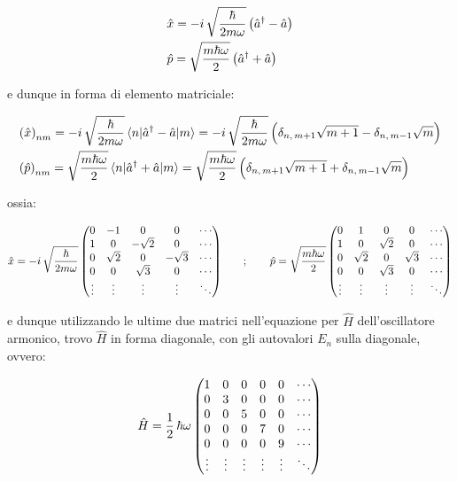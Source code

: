 \begin{nb}
\begin{align*}
	&\hat{x} = - i \, \sqrt{\frac{\hbar}{2m\omega}} \, \qty(\hat{a}^{\dagger} - \hat{a}) \\
	&\hat{p} = \sqrt{\frac{m\hbar\omega}{2}} \,\qty(\hat{a}^{\dagger} + \hat{a})
\end{align*}
\end{nb}

	e dunque in forma di elemento matriciale:
	
\begin{align*}
	&\qty(\hat{x})_{nm} = - i \, \sqrt{\frac{\hbar}{2m\omega}} \mel{n}{\hat{a}^{\dagger} - \hat{a}}{m} = - i \, \sqrt{\frac{\hbar}{2m\omega}} \, \qty\Big(\delta_{n, \, m+1} \sqrt{m+1} - \delta_{n, \, m-1}\sqrt{m}) \\
	&\qty(\hat{p})_{nm} = \sqrt{\frac{m\hbar\omega}{2}} \mel{n}{\hat{a}^{\dagger} + \hat{a}}{m} = \sqrt{\frac{m\hbar\omega}{2}} \, \qty\Big( \delta_{n, \, m+1} \sqrt{m+1} + \delta_{n, \, m-1}\sqrt{m} )
\end{align*}

	ossia:
	
\begin{align*}
	\hat{x} = - i \, \sqrt{\frac{\hbar}{2m\omega}} \,\mqty(0&-1&0&0& \cdots \\ 1&0&-\sqrt{2}&0& \cdots \\ 0&\sqrt{2}&0&-\sqrt{3}& \cdots \\ 0&0&\sqrt{3}&0& \cdots \\ \vdots&\vdots&\vdots&\vdots& \ddots ) \qquad ; \qquad \hat{p} = \sqrt{\frac{m\hbar\omega}{2}} \,  \mqty(0&1&0&0& \cdots \\1&0&\sqrt{2}&0& \cdots \\ 0&\sqrt{2}&0&\sqrt{3}& \cdots \\ 0&0&\sqrt{3}&0& \cdots \\\vdots&\vdots&\vdots&\vdots& \ddots )
\end{align*}

	e dunque utilizzando le ultime due matrici nell'equazione per $\hat{H}$ dell'oscillatore armonico, trovo $\hat{H}$ in forma diagonale, con gli autovalori $E_n$ sulla diagonale, ovvero:
	
\begin{align*}
	\hat{H} = \frac{1}{2} \, \hbar \omega \,  \mqty(1&0&0&0&0&  \cdots \\0&3&0&0&0&  \cdots \\ 0&0&5&0&0&  \cdots \\ 0&0&0&7&0&  \cdots \\ 0&0&0&0&9&  \cdots \\\vdots&\vdots&\vdots&\vdots&\vdots&  \ddots )
\end{align*}	

